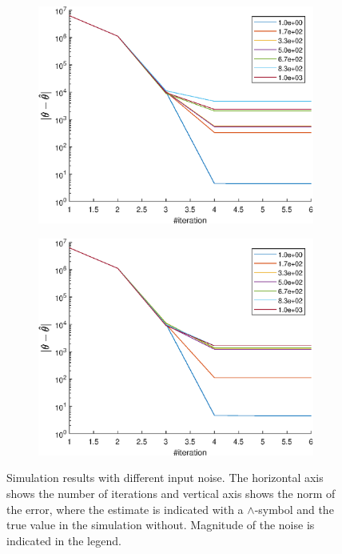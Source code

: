 \begin{figure}\ContinuedFloat
\begin{subfigure}{0.8\textwidth}
  \includegraphics[width=\linewidth]{Results/SimulationEstPos/satPosConv}  
\end{subfigure}
\begin{subfigure}{0.8\textwidth}
  \includegraphics[width=\linewidth]{Results/SimulationEstPos/GaussianConv}
\end{subfigure}
\caption{Simulation results with different input noise. The horizontal axis shows the number of iterations and vertical axis shows the norm of the error, where the estimate is indicated with a $\wedge$-symbol and the true value in the simulation without. Magnitude of the noise is indicated in the legend.} 
\label{fig:sim_est_pos_conv}
\end{figure}
